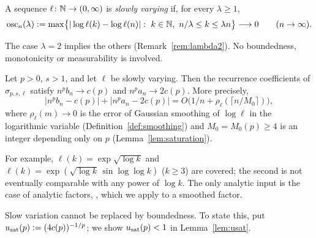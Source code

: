 \begin{definition}\label{def:sv}
A sequence $\ell\colon\mathbb{N}\to(0,\infty)$ is \emph{slowly varying} if, for every $\lambda\ge1$,
\[
  \osc_n(\lambda):=\max\bigl\{|\log\ell(k)-\log\ell(n)|:\ k\in\N,\ n/\lambda\le k\le\lambda n\bigr\}\longrightarrow0
  \qquad(n\to\infty).
\]
\end{definition}

The case $\lambda=2$ implies the others (Remark~\ref{rem:lambda2}). No boundedness, monotonicity or measurability is
involved.

\begin{theorem}\label{thm:sv}
Let $p>0$, $s>1$, and let $\ell$ be slowly varying. Then the recurrence coefficients of $\sigma_{p,s,\ell}$ satisfy
$n^pb_n\to c(p)$ and $n^pa_n\to2c(p)$. More precisely,
\begin{equation}\label{eq:sv-rate}
  |n^pb_n-c(p)|+|n^pa_n-2c(p)|=O\bigl(1/n+\rho_\ell(\lceil n/M_0\rceil)\bigr),
\end{equation}
where $\rho_\ell(m)\to0$ is the error of Gaussian smoothing of $\log\ell$ in the logarithmic variable
(Definition~\ref{def:smoothing}) and $M_0=M_0(p)\ge4$ is an integer depending only on $p$ (Lemma~\ref{lem:saturation}).
\end{theorem}

For example, $\ell(k)=\exp\sqrt{\log k}$ and $\ell(k)=\exp(\sqrt{\log k}\,\sin\log\log k)$ ($k\ge3$) are covered; the
second is not eventually comparable with any power of $\log k$. The only analytic input is the case of analytic
factors, \cite[Theorem~1.2]{PaperII}, which we apply to a smoothed factor.

Slow variation cannot be replaced by boundedness. To state this, put $u_{\mathrm{sat}}(p):=(4c(p))^{-1/p}$; we show
$u_{\mathrm{sat}}(p)<1$ in Lemma~\ref{lem:usat}.

